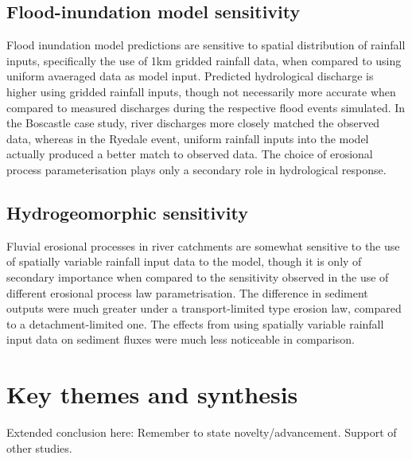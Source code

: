 \subsection{Flood-inundation model sensitivity}
Flood inundation model predictions are sensitive to spatial distribution of rainfall inputs, specifically the use of 1km gridded rainfall data, when compared to using uniform avaeraged data as model input. Predicted hydrological discharge is higher using gridded rainfall inputs, though not necessarily more accurate when compared to measured discharges during the respective flood events simulated. In the Boscastle case study, river discharges more closely matched the observed data, whereas in the Ryedale event, uniform rainfall inputs into the model actually produced a better match to observed data. The choice of erosional process parameterisation plays only a secondary role in hydrological response. 

\subsection{Hydrogeomorphic sensitivity}
Fluvial erosional processes in river catchments are somewhat sensitive to the use of spatially variable rainfall input data to the model, though it is only of secondary importance when compared to the sensitivity observed in the use of different erosional process law parametrisation. The difference in sediment outputs were much greater under a transport-limited type erosion law, compared to a detachment-limited one. The effects from using spatially variable rainfall input data on sediment fluxes were much less noticeable in comparison.

\section{Key themes and synthesis}

Extended conclusion here: Remember to state novelty/advancement. Support of other studies. 

